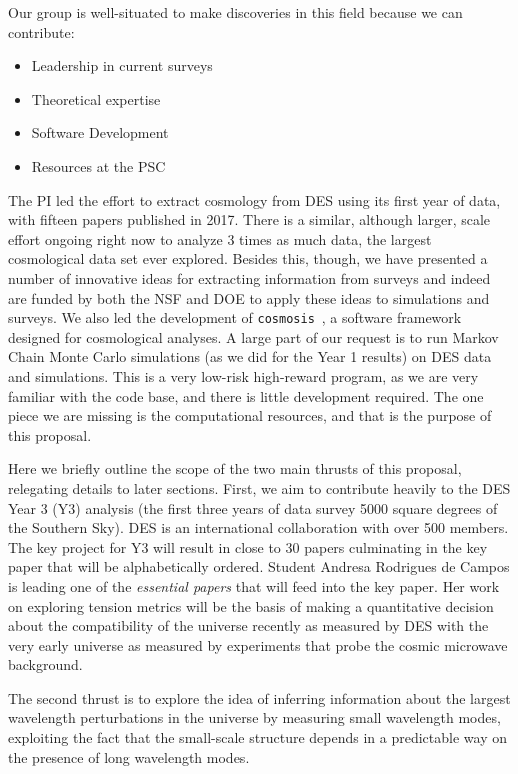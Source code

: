 \documentclass[12pt]{article}
\begin{document}
\begin{small}
Our group is well-situated to make discoveries in this field because we can contribute:
\begin{itemize}
\item Leadership in current surveys
\item Theoretical expertise
\item Software Development
\item Resources at the PSC
\end{itemize} 
The PI led the effort to extract cosmology from DES using its first year of data, with fifteen papers published in 2017. There is a similar, although larger, scale effort ongoing right now to analyze 3 times as much data, the largest cosmological data set ever explored. Besides this, though, we have presented a number of innovative ideas for extracting information from surveys and indeed are funded by both the NSF and DOE to apply these ideas to simulations and surveys. We also led the development of {\tt cosmosis}~\cite{Zuntz:2014csq}, a software framework designed for cosmological analyses. A large part of our request is to run Markov Chain Monte Carlo simulations (as we did for the Year 1 results) on DES data and simulations. This is a very low-risk high-reward program, as we are very familiar with the code base, and there is little development required. The one piece we are missing is the computational resources, and that is the purpose of this proposal.

Here we briefly outline the scope of the two main thrusts of this proposal, relegating details to later sections. First, we aim to contribute heavily to the DES Year 3 (Y3) analysis (the first three years of data survey 5000 square degrees of the Southern Sky). DES is an international collaboration with over 500 members. The key project for Y3 will result in close to 30 papers culminating in the key paper that will be alphabetically ordered. 
Student Andresa Rodrigues de Campos is leading one of the {\it essential papers} that will feed into the key paper. Her work on exploring tension metrics will be the basis of making a quantitative decision about the compatibility of the universe recently as measured by DES with the very early universe as measured by experiments that probe the cosmic microwave background.

The second thrust is to explore the idea of inferring information about the largest wavelength perturbations in the universe by measuring small wavelength modes, exploiting the fact that the small-scale structure depends in a predictable way on the presence of long wavelength modes.




\end{small}
\end{document}
